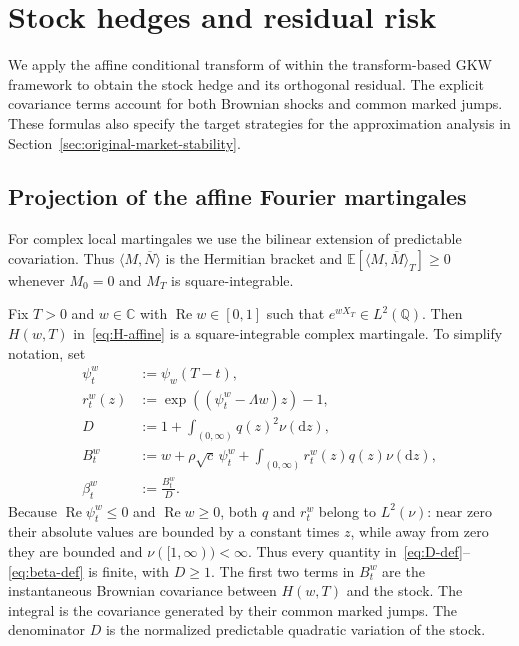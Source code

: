 \documentclass[11pt]{article}
\theoremstyle{definition}
\theoremstyle{remark}
\newcommand{\C}{\mathbb{C}}
\newcommand{\E}{\mathbb{E}}
\newcommand{\Q}{\mathbb{Q}}
\newcommand{\1}{\mathbf{1}}
\newcommand{\dd}{\mathrm{d}}
\begin{document}
\section{Stock hedges and residual risk}
\label{sec:main-results}

We apply the affine conditional transform of \citet{bondi2024} within the
transform-based GKW framework to obtain the stock hedge and its orthogonal
residual. The explicit covariance terms account for both Brownian shocks
and common marked jumps. These formulas also specify the target strategies
for the approximation analysis in
Section~\ref{sec:original-market-stability}.

\subsection{Projection of the affine Fourier martingales}

For complex local martingales we use the bilinear extension of predictable
covariation. Thus $\langle M,\overline N\rangle$ is the Hermitian bracket and
$\E[\langle M,\overline M\rangle_T]\geq0$ whenever $M_0=0$ and $M_T$ is
square-integrable.

Fix $T>0$ and $w\in\C$ with $\operatorname{Re}w\in[0,1]$ such that
$e^{wX_T}\in L^2(\Q)$. Then $H(w,T)$ in~\eqref{eq:H-affine} is a
square-integrable complex martingale. To simplify notation, set
\begin{align}
 \psi_t^w&:=\psi_w(T-t),
 \label{eq:psi-short}\\
 r_t^w(z)&:=\exp\left((\psi_t^w-\Lambda w)z\right)-1,
 \label{eq:r-short}\\
 D&:=1+\int_{(0,\infty)}q(z)^2\nu(\dd z),
 \label{eq:D-def}\\
 B_t^w&:=w+\rho\sqrt c\,\psi_t^w
       +\int_{(0,\infty)}r_t^w(z)q(z)\nu(\dd z),
 \label{eq:B-def}\\
 \beta_t^w&:=\frac{B_t^w}{D}.
 \label{eq:beta-def}
\end{align}
Because $\operatorname{Re}\psi_t^w\leq0$ and
$\operatorname{Re}w\geq0$, both $q$ and $r_t^w$ belong to $L^2(\nu)$:
near zero their absolute values are bounded by a constant times $z$, while
away from zero they are bounded and $\nu([1,\infty))<\infty$. Thus every
quantity in~\eqref{eq:D-def}--\eqref{eq:beta-def} is finite, with $D\geq1$.
The first two terms in $B_t^w$ are the instantaneous Brownian covariance
between $H(w,T)$ and the stock. The integral is the covariance generated by
their common marked jumps. The denominator $D$ is the normalized predictable
quadratic variation of the stock.
\end{document}
